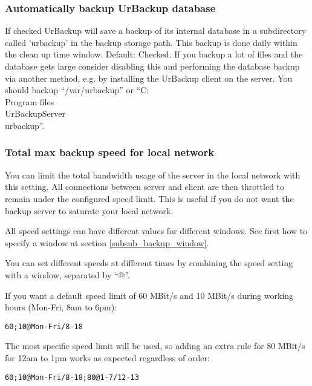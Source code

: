 \documentclass[a4paper,10pt]{article}
\begin{document}
\subsubsection{Automatically backup UrBackup database}

If checked UrBackup will save a backup of its internal database in a
subdirectory called 'urbackup' in the backup storage path. This backup is done
daily within the clean up time window. Default: Checked.
If you backup a lot of files and the database
gets large consider disabling this and performing the database backup via another method,
e.g. by installing the UrBackup client on the server. You should backup ``/var/urbackup''
or ``C:\\Program files\\UrBackupServer\\urbackup''.

\subsubsection{Total max backup speed for local network}

You can limit the total bandwidth usage of the server in the local network
with this setting. All connections between server and client are then throttled
to remain under the configured speed limit. This is useful if you do not want
the backup server to saturate your local network.

\label{speed_settings}
All speed settings can have different values for different windows. See first
how to specify a window at section \ref{subsub_backup_window}.

\par\null\par
You can set different speeds at different times by combining the speed setting with a window,
separated by ``@''.

\par\null\par
If you want a default speed limit of 60 MBit/s and 10 MBit/s during working hours (Mon-Fri, 8am to 6pm):
\begin{verbatim}
60;10@Mon-Fri/8-18
\end{verbatim}

The most specific speed limit will be used, so adding an extra rule for 80 MBit/s for 12am to 1pm works as expected regardless of order:
\begin{verbatim}
60;10@Mon-Fri/8-18;80@1-7/12-13
\end{verbatim}
\end{document}
